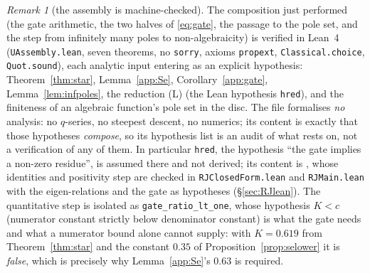 \documentclass[11pt]{article}
\theoremstyle{plain}
\theoremstyle{definition}
\theoremstyle{remark}
\newtheorem{remark}[theorem]{Remark}
\begin{document}
\begin{remark}[the assembly is machine-checked]\label{rem:uassembly}
The composition just performed (the gate arithmetic, the two halves of \eqref{eq:gate}, the
passage to the pole set, and the step from infinitely many poles to non-algebraicity) is
verified in Lean~4 (\texttt{UAssembly.lean}, seven theorems, no \texttt{sorry}, axioms
\texttt{propext}, \texttt{Classical.choice}, \texttt{Quot.sound}), each analytic input entering as
an explicit hypothesis: Theorem~\ref{thm:star}, Lemma~\ref{app:Se}, Corollary~\ref{app:gate},
Lemma~\ref{lem:infpoles}, the reduction \textup{(L)} (the Lean hypothesis \texttt{hred}), and the
finiteness of an algebraic function's
pole set in the disc. The file formalises \emph{no} analysis: no $q$-series, no steepest
descent, no numerics; its content is exactly that those hypotheses \emph{compose}, so its
hypothesis list is an audit of what {\cite[Theorem \textup{thm:U}]{Bonfioli2026bA}} rests on, not a verification of any of
them. In particular \texttt{hred}, the hypothesis ``the gate implies a non-zero residue'', is
assumed there and not derived; its content is {\cite[Theorem ``closed form of the junction pairing'', \textup{thm:RJ}]{Bonfioli2026bA}}, whose identities and
positivity step are checked in \texttt{RJClosedForm.lean} and \texttt{RJMain.lean} with the
eigen-relations and the gate as hypotheses (\S\ref{sec:RJlean}). The
quantitative step is isolated
as \texttt{gate\_ratio\_lt\_one}, whose hypothesis $K<c$ (numerator constant strictly below
denominator constant) is what the gate needs and what a numerator bound alone cannot supply:
with $K=0.619$ from Theorem~\ref{thm:star} and the constant $0.35$ of
Proposition~\ref{prop:selower} it is \emph{false}, which is precisely why Lemma~\ref{app:Se}'s
$0.63$ is required.
\end{remark}
\end{document}
